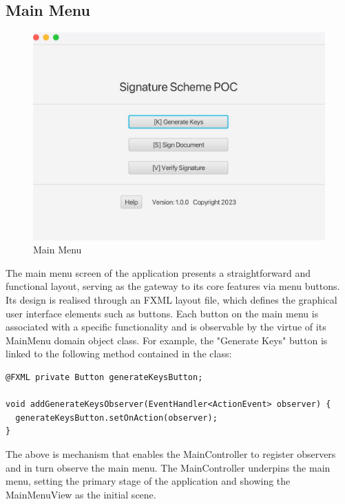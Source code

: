 \documentclass[]{final_report}
\theoremstyle{definition}
\begin{document}
\subsection{Main Menu}

\begin{figure}[H]
    \centering
    \includegraphics[scale=0.3]{poc_pictures/mainMenu.png}
    \caption{Main Menu}
\end{figure}
The main menu screen of the application presents a straightforward and functional layout, serving as the gateway to its core features via menu buttons. Its design is realised through an FXML layout file, which defines the graphical user interface elements such as buttons. Each button on the main menu is associated with a specific functionality and is observable by the virtue of its MainMenu domain object class. For example, the "Generate Keys" button is linked to the following method contained in the class:
\begin{lstlisting}[caption=Mechanism for registering observers]
@FXML private Button generateKeysButton;

void addGenerateKeysObserver(EventHandler<ActionEvent> observer) {
  generateKeysButton.setOnAction(observer);
}
\end{lstlisting}
The above is mechanism that enables the MainController to register observers and in turn observe the main menu. The MainController underpins the main menu, setting the primary stage of the application and showing the MainMenuView as the initial scene.
\end{document}

